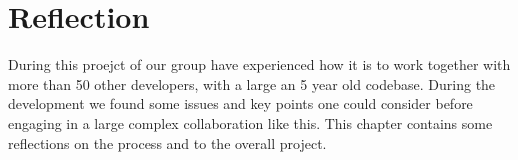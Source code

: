 \chapter{Reflection}
\label{cha:reflection}

During this proejct of \giraf our group have experienced how it is to work together with more than 50 other developers, with a large an 5 year old codebase. During the development we found some issues and key points one could consider before engaging in a large complex collaboration like this. This chapter contains some reflections on the process and to the overall project.



